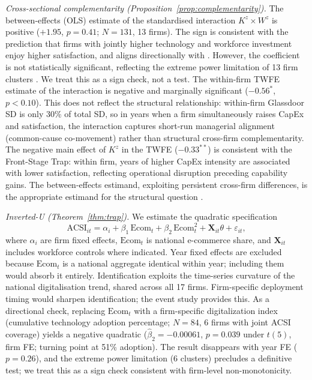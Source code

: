 \documentclass[msom,dblanonrev]{informs4}
\begin{document}
\noindent\textit{Cross-sectional complementarity (Proposition~\ref{prop:complementarity}).} The between-effects (OLS) estimate of the standardised interaction $K^z \times W^z$ is positive ($+1.95$, $p = 0.41$; $N = 131$, 13 firms). The sign is consistent with the prediction that firms with jointly higher technology and workforce investment enjoy higher satisfaction, and aligns directionally with \citet{aral2012three}. However, the coefficient is not statistically significant, reflecting the extreme power limitation of 13 firm clusters \citep{cameron2008bootstrap}. We treat this as a sign check, not a test. The within-firm TWFE estimate of the interaction is negative and marginally significant ($-0.56^{*}$, $p < 0.10$). This does not reflect the structural relationship: within-firm Glassdoor SD is only 30\% of total SD, so in years when a firm simultaneously raises CapEx and satisfaction, the interaction captures short-run managerial alignment (common-cause co-movement) rather than structural cross-firm complementarity. The negative main effect of $K^z$ in the TWFE ($-0.33^{**}$) is consistent with the Front-Stage Trap: within firm, years of higher CapEx intensity are associated with lower satisfaction, reflecting operational disruption preceding capability gains. The between-effects estimand, exploiting persistent cross-firm differences, is the appropriate estimand for the structural question \citep{milgrom1990economics}.

\noindent\textit{Inverted-U (Theorem~\ref{thm:trap}).} We estimate the quadratic specification
\begin{equation}\label{eq:invU}
    \mathrm{ACSI}_{it} = \alpha_i + \beta_1\,\mathrm{Ecom}_t + \beta_2\,\mathrm{Ecom}_t^2 + \mathbf{X}_{it}\theta + \varepsilon_{it},
\end{equation}
where $\alpha_i$ are firm fixed effects, $\mathrm{Ecom}_t$ is national e-commerce share, and $\mathbf{X}_{it}$ includes workforce controls where indicated. Year fixed effects are excluded because $\mathrm{Ecom}_t$ is a national aggregate identical within year; including them would absorb it entirely. Identification exploits the time-series curvature of the national digitalisation trend, shared across all 17 firms. Firm-specific deployment timing would sharpen identification; the event study provides this. As a directional check, replacing $\mathrm{Ecom}_t$ with a firm-specific digitalization index (cumulative technology adoption percentage; $N = 84$, 6 firms with joint ACSI coverage) yields a negative quadratic ($\hat{\beta}_2 = -0.00061$, $p = 0.039$ under $t(5)$, firm FE; turning point at 51\% adoption). The result disappears with year FE ($p = 0.26$), and the extreme power limitation (6 clusters) precludes a definitive test; we treat this as a sign check consistent with firm-level non-monotonicity.
\end{document}
